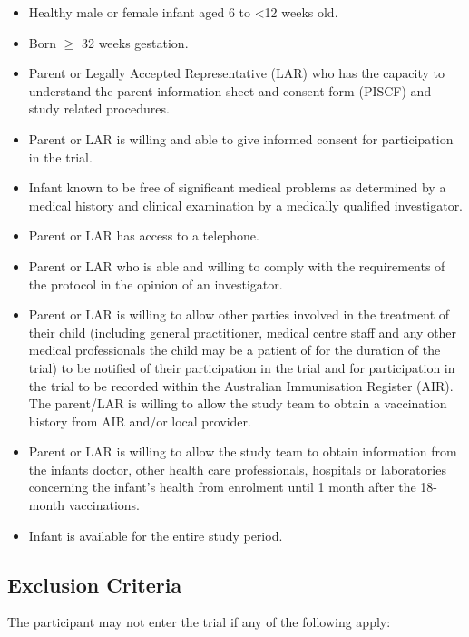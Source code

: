 \documentclass{bmcart}
\begin{document}
\begin{itemize}
	\item Healthy male or female infant aged 6 to \textless12 weeks old.
	\item Born $\geq$ 32 weeks gestation.
	\item
	Parent or Legally Accepted Representative (LAR) who has the capacity to understand the parent information sheet and consent form (PISCF) and study related procedures.
	\item Parent or LAR is willing and able to give informed consent for participation in the trial.
	\item Infant known to be free of significant medical problems as determined by a medical history and clinical examination by a medically qualified investigator.
	\item Parent or LAR has access to a telephone.
	\item Parent or LAR who is able and willing to comply with the requirements of the protocol in the opinion of an investigator.
	\item Parent or LAR is willing to allow other parties involved in the treatment of their child (including general practitioner, medical centre staff and any other medical professionals the child may be a patient of for the duration of the trial) to be notified of their participation in the trial and for participation in the trial to be recorded within the Australian Immunisation Register (AIR). The parent/LAR is willing to allow the study team to obtain a vaccination history from AIR and/or local provider.
	\item Parent or LAR is willing to allow the study team to obtain information from the infants doctor, other health care professionals, hospitals or laboratories concerning the infant's health from enrolment until 1 month after the 18-month vaccinations.
	\item Infant is available for the entire study period.
\end{itemize}


\subsection*{Exclusion Criteria}

The participant may not enter the trial if any of the following apply:
\end{document}
